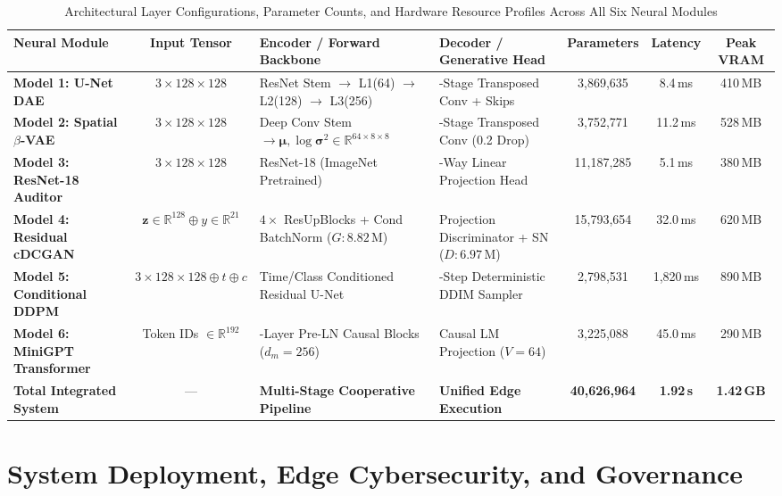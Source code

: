 \documentclass[journal]{IEEEtran}
\begin{document}
\begin{table}[!t]
\caption{Architectural Layer Configurations, Parameter Counts, and Hardware Resource Profiles Across All Six Neural Modules}
\label{tab:arch_specs}
\centering
\scriptsize
\renewcommand{\arraystretch}{1.18}
\setlength{\tabcolsep}{4.5pt}
\begin{tabularx}{\textwidth}{@{}l c >{\raggedright\arraybackslash}X >{\raggedright\arraybackslash}X c c c@{}}
\toprule
\textbf{Neural Module} & \textbf{Input Tensor} & \textbf{Encoder / Forward Backbone} & \textbf{Decoder / Generative Head} & \textbf{Parameters} & \textbf{Latency} & \textbf{Peak VRAM} \\
\midrule
\textbf{Model 1: U-Net DAE} & $3 \times 128 \times 128$ & ResNet Stem $\to$ L1(64) $\to$ L2(128) $\to$ L3(256) & 4-Stage Transposed Conv + Skips & 3,869,635 & 8.4\,ms & 410\,MB \\
\textbf{Model 2: Spatial $\beta$-VAE} & $3 \times 128 \times 128$ & Deep Conv Stem $\to \bm{\mu}, \log\bm{\sigma}^2 \in \mathbb{R}^{64 \times 8 \times 8}$ & 4-Stage Transposed Conv (0.2 Drop) & 3,752,771 & 11.2\,ms & 528\,MB \\
\textbf{Model 3: ResNet-18 Auditor} & $3 \times 128 \times 128$ & ResNet-18 (ImageNet Pretrained) & 21-Way Linear Projection Head & 11,187,285 & 5.1\,ms & 380\,MB \\
\textbf{Model 4: Residual cDCGAN} & $\mathbf{z} \in \mathbb{R}^{128} \oplus y \in \mathbb{R}^{21}$ & $4\times$ ResUpBlocks + Cond BatchNorm ($G: 8.82\,\text{M}$) & Projection Discriminator + SN ($D: 6.97\,\text{M}$) & 15,793,654 & 32.0\,ms & 620\,MB \\
\textbf{Model 5: Conditional DDPM} & $3 \times 128 \times 128 \oplus t \oplus c$ & Time/Class Conditioned Residual U-Net & 20-Step Deterministic DDIM Sampler & 2,798,531 & 1,820\,ms & 890\,MB \\
\textbf{Model 6: MiniGPT Transformer} & Token IDs $\in \mathbb{R}^{192}$ & 4-Layer Pre-LN Causal Blocks ($d_m=256$) & Causal LM Projection ($V=64$) & 3,225,088 & 45.0\,ms & 290\,MB \\
\midrule
\textbf{Total Integrated System} & --- & \textbf{Multi-Stage Cooperative Pipeline} & \textbf{Unified Edge Execution} & \textbf{40,626,964} & \textbf{1.92\,s} & \textbf{1.42\,GB} \\
\bottomrule
\end{tabularx}
\end{table}

\section{System Deployment, Edge Cybersecurity, and Governance}
\end{document}
